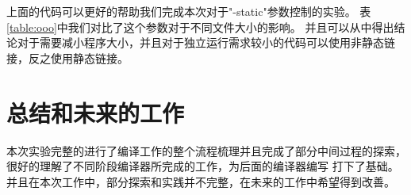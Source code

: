 \documentclass[UTF8]{ctexart}
\begin{document}
上面的代码可以更好的帮助我们完成本次对于"-static"参数控制的实验。
表{\ref{table:ooo}}中我们对比了这个参数对于不同文件大小的影响。
并且可以从中得出结论对于需要减小程序大小，并且对于独立运行需求较小的代码可以使用非静态链接，反之使用静态链接。

\section{总结和未来的工作}
本次实验完整的进行了编译工作的整个流程梳理并且完成了部分中间过程的探索，很好的理解了不同阶段编译器所完成的工作，为后面的编译器编写
打下了基础。并且在本次工作中，部分探索和实践并不完整，在未来的工作中希望得到改善。

\end{document}
